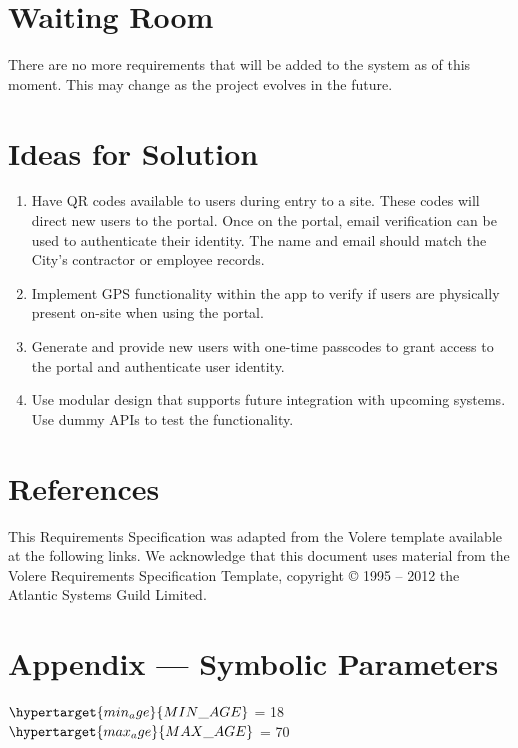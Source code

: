 \documentclass[12pt]{article}
\begin{document}
\section{Waiting Room}
There are no more requirements that will be added to the system as of this
moment. This may change as the project evolves in the future.

\section{Ideas for Solution}
\begin{enumerate}
  \item Have QR codes available to users during entry to a site.
    These codes will direct new users to the portal. Once on the
    portal, email verification can be used to authenticate their
    identity. The name and email should match the City's contractor
    or employee records.
  \item Implement GPS functionality within the app to verify if users
    are physically present on-site when using the portal.
  \item Generate and provide new users with one-time passcodes to
    grant access to the portal and authenticate user identity.
  \item Use modular design that supports future integration with
    upcoming systems. Use dummy APIs to test the functionality.
\end{enumerate}

\section{References}
This Requirements Specification was adapted from the Volere template
available at the following links.
We acknowledge that this document uses material from the Volere Requirements
Specification Template, copyright © 1995 – 2012 the Atlantic Systems
Guild Limited.

  \newpage{}
  \section*{Appendix --- Symbolic Parameters}
  $\hypertarget{min_age}{MIN\_AGE}$ = 18\\
  $\hypertarget{max_age}{MAX\_AGE}$ = 70
\end{document}
